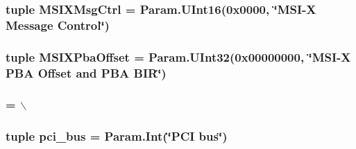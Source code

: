 \label{classPci_1_1PciDevice_a6a52f9ecc10f528668ebfaf713c55e2a}
\hypertarget{classPci_1_1PciDevice_ad9aad2a746e4f73b81c82107c83b3c28}{
\subsubsection[{MSIXMsgCtrl}]{\setlength{\rightskip}{0pt plus 5cm}tuple {\bf MSIXMsgCtrl} = Param.UInt16(0x0000, \char`\"{}MSI-\/X Message Control\char`\"{})}}
\label{classPci_1_1PciDevice_ad9aad2a746e4f73b81c82107c83b3c28}
\hypertarget{classPci_1_1PciDevice_a1db7de1e6c775093807199cb4a7b2236}{
\subsubsection[{MSIXPbaOffset}]{\setlength{\rightskip}{0pt plus 5cm}tuple {\bf MSIXPbaOffset} = Param.UInt32(0x00000000, \char`\"{}MSI-\/X PBA Offset and PBA BIR\char`\"{})}}
\label{classPci_1_1PciDevice_a1db7de1e6c775093807199cb4a7b2236}
\hypertarget{classPci_1_1PciDevice_a6415778fada7dfc7f0e386b9112df28e}{
\subsubsection[{MSIXTableOffset}]{ = $\backslash$}}
\label{classPci_1_1PciDevice_a6415778fada7dfc7f0e386b9112df28e}
\hypertarget{classPci_1_1PciDevice_a538a7615188508d868dc8e9fc8f03ced}{
\subsubsection[{pci\_\-bus}]{\setlength{\rightskip}{0pt plus 5cm}tuple {\bf pci\_\-bus} = Param.Int(\char`\"{}PCI bus\char`\"{})}}
